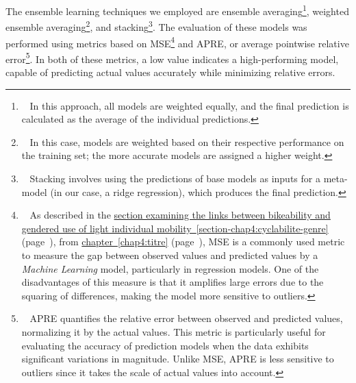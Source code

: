 \begin{refsegment}
The ensemble learning techniques we employed are ensemble averaging\footnote{~
    In this approach, all models are weighted equally, and the final prediction is calculated as the average of the individual predictions.
}, weighted ensemble averaging\footnote{~
    In this case, models are weighted based on their respective performance on the training set; the more accurate models are assigned a higher weight.
}, and stacking\footnote{~
    Stacking involves using the predictions of base models as inputs for a meta-model (in our case, a ridge regression), which produces the final prediction.
}. The evaluation of these models was performed using metrics based on \acrfull{MSE}\footnote{~
    As described in the \hyperref[section-chap4:cyclabilite-genre]{section examining the links between bikeability and gendered use of light individual mobility~\ref{section-chap4:cyclabilite-genre}} (page~\pageref{section-chap4:cyclabilite-genre}), from \hyperref[chap4:titre]{chapter~\ref{chap4:titre}} (page~\pageref{chap4:titre}), \acrfull{MSE} is a commonly used metric to measure the gap between observed values and predicted values by a \textsl{Machine Learning} model, particularly in regression models. One of the disadvantages of this measure is that it amplifies large errors due to the squaring of differences, making the model more sensitive to outliers.
} and \acrfull{APRE}, or average pointwise relative error\footnote{~
    \acrfull{APRE} quantifies the relative error between observed and predicted values, normalizing it by the actual values. This \gls{metric} is particularly useful for evaluating the accuracy of prediction models when the data exhibits significant variations in magnitude. Unlike \acrshort{MSE}, \acrshort{APRE} is less sensitive to outliers since it takes the scale of actual values into account.
}. In both of these metrics, a low value indicates a high-performing model, capable of predicting actual values accurately while minimizing relative errors.


\end{refsegment}
